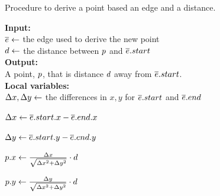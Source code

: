 

    \begin{algorithm}[tb!]
        \caption{Procedure to derive a point based an edge and a distance.}\label{alg:derive corridor point}
        \textbf{Input:} \\
        $ \protect\overline{e} \gets $ the edge used to derive the new point \\
        $ d \gets $ the distance between $ \PointP $ and $ \protect\overline{e}.start $ \\

        \textbf{Output:} \\
        A point, $ \PointP $, that is distance $ d $ away from $ \protect\overline{e}.start $. \\
    
        \textbf{Local variables:} \\
        $ \Delta x, \Delta y \gets $ the differences in $ x, y $ for $ \protect\overline{e}.start $ and $ \protect\overline{e}.end $ \\
    
        \begin{algorithmic}[1]
                \State $ \Delta x \gets \protect\overline{e}.start.x - \protect\overline{e}.end.x $
    
                \State $ \Delta y \gets \protect\overline{e}.start.y - \protect\overline{e}.end.y $
    
                \State $ p.x \gets \frac{\Delta x}{\sqrt{\Delta x^2 + \Delta y^2}} \cdot d $
    
                \State $ p.y \gets \frac{\Delta y}{\sqrt{\Delta x^2 + \Delta y^2}} \cdot d $
    
            \State \Return{$ \PointP $}
    
            \EndProcedure
    
        \end{algorithmic}
    \end{algorithm}
    



